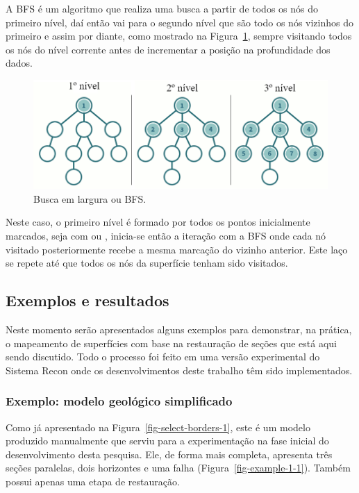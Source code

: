 A BFS é um algoritmo que realiza uma busca a partir de todos os nós do primeiro nível, daí então vai para o segundo nível que são todo os nós vizinhos do primeiro e assim por diante\cite{Nilsson}, como mostrado na Figura~\ref{fig-bfs}, sempre visitando todos os nós do nível corrente antes de incrementar a posição na profundidade dos dados.

\begin{figure} [h]
  \begin{center}
    \includegraphics[width=350pt]{images/fig-bfs}
    \caption{Busca em largura ou BFS.\cite{BFS}}\label{fig-bfs}
  \end{center}
\end{figure}

Neste caso, o primeiro nível é formado por todos os pontos inicialmente marcados, seja com  ou , inicia-se então a iteração com a BFS onde cada nó visitado posteriormente recebe a mesma marcação do vizinho anterior. Este laço se repete até que todos os nós da superfície tenham sido visitados.

\subsection{Exemplos e resultados}

Neste momento serão apresentados alguns exemplos para demonstrar, na prática, o mapeamento de superfícies com base na restauração de seções que está aqui sendo discutido. Todo o processo foi feito em uma versão experimental do Sistema Recon onde os desenvolvimentos deste trabalho têm sido implementados.

\subsubsection{Exemplo: modelo geológico simplificado}

Como já apresentado na Figura~\ref{fig-select-borders-1}, este é um modelo produzido manualmente que serviu para a experimentação na fase inicial do desenvolvimento desta pesquisa. Ele, de forma mais completa, apresenta três seções paralelas, dois horizontes e uma falha (Figura~\ref{fig-example-1-1}). Também possui apenas uma etapa de restauração. 

